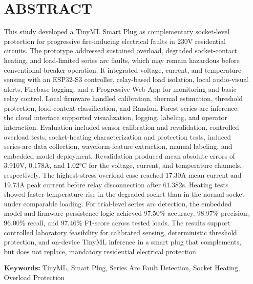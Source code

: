 ﻿\chapter*{ABSTRACT}
This study developed a TinyML Smart Plug as complementary socket-level
protection for progressive fire-inducing electrical faults in 230V
residential circuits. The prototype addressed sustained overload,
degraded socket-contact heating, and load-limited series arc faults,
which may remain hazardous before conventional breaker operation. It
integrated voltage, current, and temperature sensing with an ESP32-S3
controller, relay-based load isolation, local audio-visual alerts,
Firebase logging, and a Progressive Web App for monitoring and basic
relay control. Local firmware handled calibration, thermal estimation,
threshold protection, load-context classification, and Random Forest
series-arc inference; the cloud interface supported visualization,
logging, labeling, and operator interaction. Evaluation included sensor
calibration and revalidation, controlled overload tests, socket-heating
characterization and protection tests, induced series-arc data
collection, waveform-feature extraction, manual labeling, and embedded
model deployment. Revalidation produced mean absolute errors of 3.910V,
0.178A, and 1.02°C for the voltage, current, and temperature channels,
respectively. The highest-stress overload case reached 17.30A mean
current and 19.73A peak current before relay disconnection after
61.382s. Heating tests showed faster temperature rise in the degraded
socket than in the normal socket under comparable loading. For
trial-level series arc detection, the embedded model and firmware
persistence logic achieved 97.50\% accuracy, 98.97\% precision, 96.00\%
recall, and 97.46\% F1-score across tested loads. The results support
controlled laboratory feasibility for calibrated sensing, deterministic
threshold protection, and on-device TinyML inference in a smart plug that
complements, but does not replace, mandatory residential electrical
protection.

\textbf{Keywords:} TinyML, Smart Plug, Series Arc Fault Detection,
Socket Heating, Overload Protection

